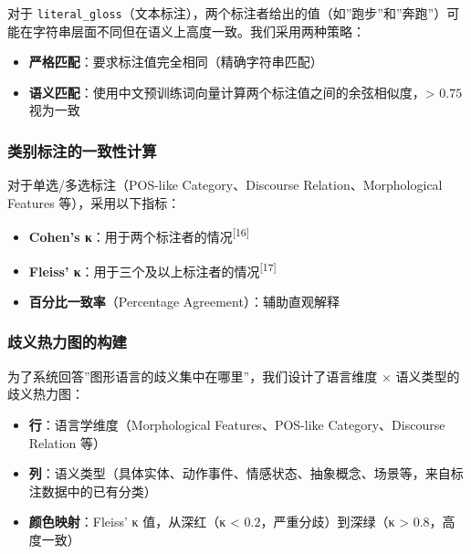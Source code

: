 \documentclass[12pt,a4paper,UTF8,fontset=founder]{ctexart}
\begin{document}
对于 \texttt{literal\_gloss}（文本标注），两个标注者给出的值（如''跑步''和''奔跑''）可能在字符串层面不同但在语义上高度一致。我们采用两种策略：

\begin{itemize}

\item
  \textbf{严格匹配}：要求标注值完全相同（精确字符串匹配）
\item
  \textbf{语义匹配}：使用中文预训练词向量计算两个标注值之间的余弦相似度，\textgreater{} $0.75$ 视为一致
\end{itemize}

\subsubsection{类别标注的一致性计算}\label{ux7c7bux522bux6807ux6ce8ux7684ux4e00ux81f4ux6027ux8ba1ux7b97}

对于单选/多选标注（POS-like Category、Discourse Relation、Morphological Features 等），采用以下指标：

\begin{itemize}

\item
  \textbf{Cohen's κ}：用于两个标注者的情况\textsuperscript{{[}16{]}}
\item
  \textbf{Fleiss' κ}：用于三个及以上标注者的情况\textsuperscript{{[}17{]}}
\item
  \textbf{百分比一致率}（Percentage Agreement）：辅助直观解释
\end{itemize}

\subsubsection{歧义热力图的构建}\label{ux6b67ux4e49ux70edux529bux56feux7684ux6784ux5efa}

为了系统回答''图形语言的歧义集中在哪里''，我们设计了语言维度 × 语义类型的歧义热力图：

\begin{itemize}

\item
  \textbf{行}：语言学维度（Morphological Features、POS-like Category、Discourse Relation 等）
\item
  \textbf{列}：语义类型（具体实体、动作事件、情感状态、抽象概念、场景等，来自标注数据中的已有分类）
\item
  \textbf{颜色映射}：Fleiss' κ 值，从深红（κ \textless{} $0.2$，严重分歧）到深绿（κ \textgreater{} $0.8$，高度一致）
\end{itemize}
\end{document}
